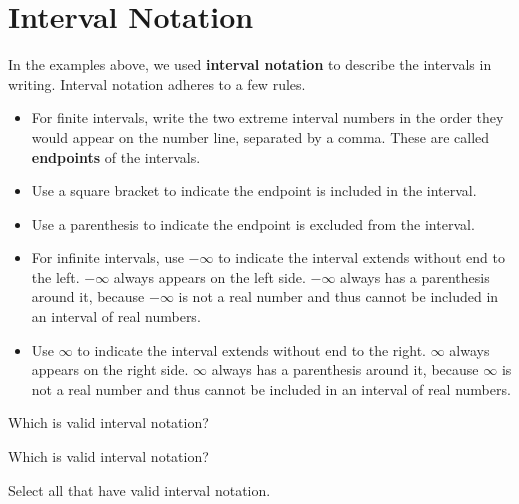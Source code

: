 \documentclass{ximera}
\begin{document}
\section{Interval Notation}

In the examples above, we used \textbf{interval notation} to describe the intervals in writing. Interval notation adheres to a few rules.

\begin{itemize}
\item For finite intervals, write the two extreme interval numbers in the order they would appear on the number line, separated by a comma.  These are called \textbf{endpoints} of the intervals.
\item Use a square bracket to indicate the endpoint is included in the interval.
\item Use a parenthesis to indicate the endpoint is excluded from the interval.
\item For infinite intervals, use $-\infty$ to indicate the interval extends without end to the left. $-\infty$ always appears on the left side. $-\infty$ always has a parenthesis around it, because $-\infty$ is not a real number and thus cannot be included in an interval of real numbers.
\item Use $\infty$ to indicate the interval extends without end to the right. $\infty$ always appears on the right side. $\infty$ always has a parenthesis around it, because $\infty$ is not a real number and thus cannot be included in an interval of real numbers. 
\end{itemize}


\begin{question}
Which is valid interval notation?
	\begin{multipleChoice}
	\choice {$[3, -2)$}
	\choice [correct]{$[-2, 3)$}
	\end{multipleChoice}
\end{question}



\begin{question}
Which is valid interval notation?
	\begin{multipleChoice}
	\choice {$[1, \infty]$}
	\choice [correct]{$[1, \infty)$}
	\end{multipleChoice}
\end{question}



\begin{question}
Select all that have valid interval notation.
	\begin{selectAll}
	\choice {$[-3, -5]$}
	\choice [correct]{$[1, 8)$}
	\choice [correct]{$(-\infty, -4]$}
	\choice {$[-\infty, 7)$}
	\choice [correct]{$(-1, 2]$}
	\choice {$[6, 2]$}
	\end{selectAll}
\end{question}
\end{document}
